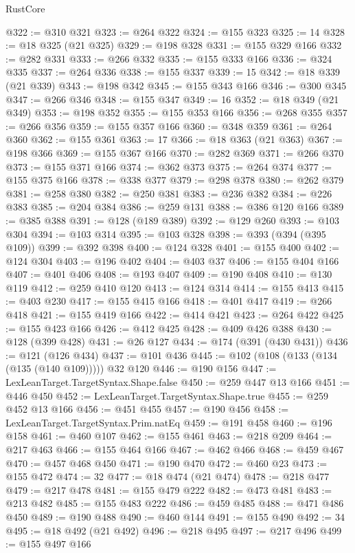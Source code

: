 \begin{lexlean}{RustCore}
\begin{coremodule}
@322 := @310 @321
@323 := @264 @322
@324 := @155 @323
@325 := 14
@328 := @18 @325 (@21 @325)
@329 := @198 @328
@331 := @155 @329 @166
@332 := @282 @331
@333 := @266 @332
@335 := @155 @333 @166
@336 := @324 @335
@337 := @264 @336
@338 := @155 @337
@339 := 15
@342 := @18 @339 (@21 @339)
@343 := @198 @342
@345 := @155 @343 @166
@346 := @300 @345
@347 := @266 @346
@348 := @155 @347
@349 := 16
@352 := @18 @349 (@21 @349)
@353 := @198 @352
@355 := @155 @353 @166
@356 := @268 @355
@357 := @266 @356
@359 := @155 @357 @166
@360 := @348 @359
@361 := @264 @360
@362 := @155 @361
@363 := 17
@366 := @18 @363 (@21 @363)
@367 := @198 @366
@369 := @155 @367 @166
@370 := @282 @369
@371 := @266 @370
@373 := @155 @371 @166
@374 := @362 @373
@375 := @264 @374
@377 := @155 @375 @166
@378 := @338 @377
@379 := @298 @378
@380 := @262 @379
@381 := @258 @380
@382 := @250 @381
@383 := @236 @382
@384 := @226 @383
@385 := @204 @384
@386 := @259 @131
@388 := @386 @120 @166
@389 := @385 @388
@391 := @128 (@189 @389)
@392 := @129 @260
@393 := @103 @304
@394 := @103 @314
@395 := @103 @328
@398 := @393 (@394 (@395 @109))
@399 := @392 @398
@400 := @124 @328
@401 := @155 @400
@402 := @124 @304
@403 := @196 @402
@404 := @403 @37
@406 := @155 @404 @166
@407 := @401 @406
@408 := @193 @407
@409 := @190 @408
@410 := @130 @119
@412 := @259 @410 @120
@413 := @124 @314
@414 := @155 @413
@415 := @403 @230
@417 := @155 @415 @166
@418 := @401 @417
@419 := @266 @418
@421 := @155 @419 @166
@422 := @414 @421
@423 := @264 @422
@425 := @155 @423 @166
@426 := @412 @425
@428 := @409 @426 @388
@430 := @128 (@399 @428)
@431 := @26 @127
@434 := @174 (@391 (@430 @431))
@436 := @121 (@126 @434)
@437 := @101 @436
@445 := @102 (@108 (@133 (@134 (@135 (@140 @109))))) @32 @120
@446 := @190 @156
@447 := LexLeanTarget.TargetSyntax.Shape.false
@450 := @259 @447 @13 @166
@451 := @446 @450
@452 := LexLeanTarget.TargetSyntax.Shape.true
@455 := @259 @452 @13 @166
@456 := @451 @455
@457 := @190 @456
@458 := LexLeanTarget.TargetSyntax.Prim.natEq
@459 := @191 @458
@460 := @196 @158
@461 := @460 @107
@462 := @155 @461
@463 := @218 @209
@464 := @217 @463
@466 := @155 @464 @166
@467 := @462 @466
@468 := @459 @467
@470 := @457 @468 @450
@471 := @190 @470
@472 := @460 @23
@473 := @155 @472
@474 := 32
@477 := @18 @474 (@21 @474)
@478 := @218 @477
@479 := @217 @478
@481 := @155 @479 @222
@482 := @473 @481
@483 := @213 @482
@485 := @155 @483 @222
@486 := @459 @485
@488 := @471 @486 @450
@489 := @190 @488
@490 := @460 @144
@491 := @155 @490
@492 := 34
@495 := @18 @492 (@21 @492)
@496 := @218 @495
@497 := @217 @496
@499 := @155 @497 @166

\end{coremodule}
\end{lexlean}
